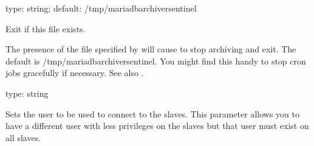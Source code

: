 \documentclass[letterpaper,10pt,english]{sphinxmanual}
\begin{document}

\begin{fulllineitems}
\label{\detokenize{mariadb-archiver:cmdoption-mariadb-archiver-sentinel}}
type: string; default: /tmp/mariadb\sphinxhyphen{}archiver\sphinxhyphen{}sentinel

Exit if this file exists.

The presence of the file specified by {\hyperref[\detokenize{mariadb-archiver:cmdoption-mariadb-archiver-sentinel}]{}} will cause  to
stop archiving and exit.  The default is /tmp/mariadb\sphinxhyphen{}archiver\sphinxhyphen{}sentinel.  You
might find this handy to stop cron jobs gracefully if necessary.  See also
{\hyperref[\detokenize{mariadb-archiver:cmdoption-mariadb-archiver-stop}]{}}.

\end{fulllineitems}


\begin{fulllineitems}
\label{\detokenize{mariadb-archiver:cmdoption-mariadb-archiver-slave-user}}
type: string

Sets the user to be used to connect to the slaves.
This parameter allows you to have a different user with less privileges on the
slaves but that user must exist on all slaves.

\end{fulllineitems}
\end{document}
